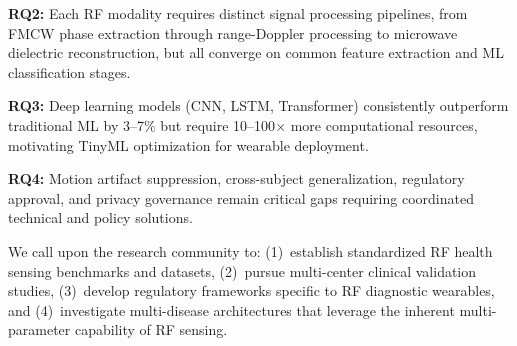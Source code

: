 \documentclass[journal,twoside]{IEEEtran}
\begin{document}
\textbf{RQ2:} Each RF modality requires distinct signal processing pipelines, from FMCW phase extraction through range-Doppler processing to microwave dielectric reconstruction, but all converge on common feature extraction and ML classification stages.

\textbf{RQ3:} Deep learning models (CNN, LSTM, Transformer) consistently outperform traditional ML by 3--7\% but require 10--100$\times$ more computational resources, motivating TinyML optimization for wearable deployment.

\textbf{RQ4:} Motion artifact suppression, cross-subject generalization, regulatory approval, and privacy governance remain critical gaps requiring coordinated technical and policy solutions.

We call upon the research community to: (1)~establish standardized RF health sensing benchmarks and datasets, (2)~pursue multi-center clinical validation studies, (3)~develop regulatory frameworks specific to RF diagnostic wearables, and (4)~investigate multi-disease architectures that leverage the inherent multi-parameter capability of RF sensing.


\end{document}
